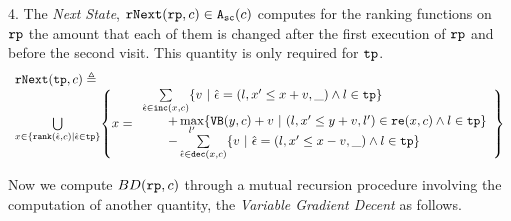 \begin{defn}
 4. The \emph{Next State}, $\mathtt{rNext}(\mathtt{rp}, c) \in {\ensuremath{\mathtt{A_{sc}}}}(c)$ 
 computes for the ranking functions on $\mathtt{rp}$ the amount that each of them is changed after the first execution of $\mathtt{rp}$ and before the second visit. This quantity is only required for $\mathtt{tp}$.
 {\small
 \[
 \begin{array}{l}
 \rfnext(\tpath, c) \triangleq 
 \\
 \bigcup\limits_{x \in \left\{ \rank(\absevent, c) | \absevent \in \tpath \right\}}
 \left\{ x = 
 \begin{array}{l}
 \sum\limits_{\absevent \in \inc(x, c) }
 \left\{ v ~\middle\vert~ \absevent = (l, x' \leq x + v, \_) \land l \in \tpath\right\}
 \\ \qquad 
 + \max\limits_{l' }
 \left\{ \varinvar(y, c) + v ~\middle\vert~ (l, x' \leq y + v, l') \in \reset(x, c) \land l \in \tpath\right\}
 \\ \qquad 
 - \sum\limits_{ \absevent \in \dec(x, c) }\left\{ 
 v ~\middle\vert~ \absevent = (l, x' \leq x - v, \_) \land l \in \tpath 
 \right\}
 \end{array}
 \right\} 
 \end{array}
 \]
 }
\end{defn}
Now we compute $BD(\mathtt{rp}, c)$ through a mutual recursion procedure involving the computation of another quantity, the \emph{Variable Gradient Decent} as follows.

